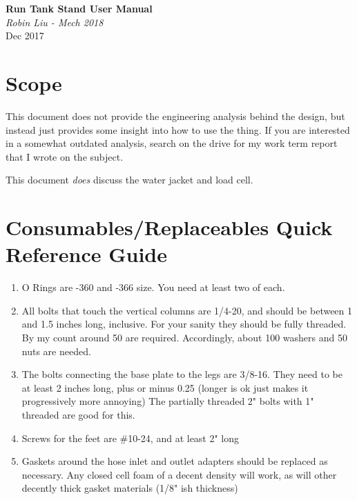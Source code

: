 \documentclass[11pt]{article}
\begin{document}
\begin{titlepage}
   \begin{center}
      \Large\textbf{Run Tank Stand User Manual}\\
      \bigskip
      \large\textit{Robin Liu - Mech 2018}\\
      \bigskip
      Dec 2017
   \end{center}
\end{titlepage}

\section{Scope}
This document does not provide the engineering analysis behind the design, but instead just provides some insight into how to use the thing. If you are interested in a somewhat outdated analysis, search on the drive for my work term report that I wrote on the subject.

This document \textit{does} discuss the water jacket and load cell.

\section{Consumables/Replaceables Quick Reference Guide}
\begin{enumerate}
	\item O Rings are -360 and -366 size. You need at least two of each.
	\item All bolts that touch the vertical columns are 1/4-20, and should be between 1 and 1.5 inches long, inclusive. For your sanity they should be fully threaded. By my count around 50 are required. Accordingly, about 100 washers and 50 nuts are needed.
	\item The bolts connecting the base plate to the legs are 3/8-16. They need to be at least 2 inches long, plus or minus 0.25 (longer is ok just makes it progressively more annoying) The partially threaded 2" bolts with 1" threaded are good for this.
	\item Screws for the feet are \#10-24, and at least 2" long
	\item Gaskets around the hose inlet and outlet adapters should be replaced as necessary. Any closed cell foam of a decent density will work, as will other decently thick gasket materials (1/8" ish thickness)
\end{enumerate}
\end{document}
